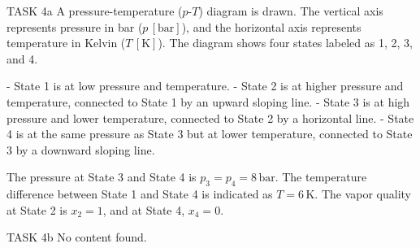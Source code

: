 TASK 4a  
A pressure-temperature (\( p \)-\( T \)) diagram is drawn. The vertical axis represents pressure in bar (\( p \, [\text{bar}] \)), and the horizontal axis represents temperature in Kelvin (\( T \, [\text{K}] \)). The diagram shows four states labeled as 1, 2, 3, and 4.  

- State 1 is at low pressure and temperature.  
- State 2 is at higher pressure and temperature, connected to State 1 by an upward sloping line.  
- State 3 is at high pressure and lower temperature, connected to State 2 by a horizontal line.  
- State 4 is at the same pressure as State 3 but at lower temperature, connected to State 3 by a downward sloping line.  

The pressure at State 3 and State 4 is \( p_3 = p_4 = 8 \, \text{bar} \).  
The temperature difference between State 1 and State 4 is indicated as \( T = 6 \, \text{K} \).  
The vapor quality at State 2 is \( x_2 = 1 \), and at State 4, \( x_4 = 0 \).  

TASK 4b  
No content found.